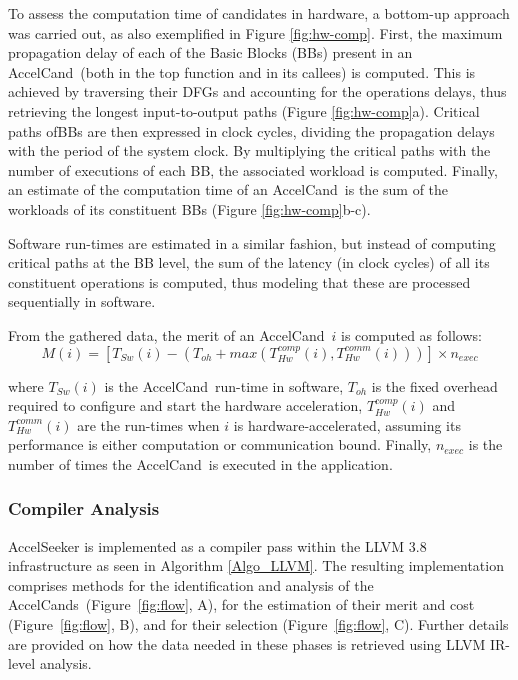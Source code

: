 \documentclass[]{usiinfthesis}
\newcommand{\candidate}{{AccelCand}}
\newcommand{\candidates}{{AccelCand}s}
\begin{document}
To assess the computation time of candidates in hardware, a bottom-up approach was carried out, as also 
exemplified in Figure \ref{fig:hw-comp}. First, the maximum propagation delay of each of the Basic Blocks 
(BBs) present in an \candidate\ (both in the top function and in its callees) is computed.  This is 
achieved by traversing their DFGs and accounting for the operations delays, thus retrieving the longest 
input-to-output paths (Figure \ref{fig:hw-comp}a).  Critical paths ofBBs are then expressed in clock cycles, 
dividing the propagation delays with the period of the system clock. By multiplying the critical paths with 
the number of executions of each BB, the associated workload is computed. Finally, an estimate of the computation time of an \candidate\ is the sum of the workloads of its constituent BBs 
(Figure \ref{fig:hw-comp}b-c).\par

Software run-times are estimated in a similar fashion, but instead of computing critical paths at the BB 
level, the sum of the latency (in clock cycles) of all its constituent operations is computed, thus modeling 
that these are processed sequentially in software.\par

From the gathered data, the merit of an \candidate\ $i$ is computed as
follows:
\begin{equation*}
M(i) = [ T_{Sw}(i) - (T_{oh}+max(T_{Hw}^{comp}(i),T_{Hw}^{comm}(i))) ] \times n_{exec}
\label{eq:inference}
\end{equation*}

where $T_{Sw}(i)$ is the \candidate\ run-time in software, $T_{oh}$ is
the fixed overhead required to configure and start the hardware
acceleration, $T_{Hw}^{comp}(i)$ and $T_{Hw}^{comm}(i)$ are the
run-times when $i$ is hardware-accelerated, assuming its performance
is either computation or communication bound.  Finally, $n_{exec}$ is
the number of times the \candidate\ is executed in the application.

\subsubsection{Compiler Analysis}

AccelSeeker is implemented as a compiler pass within the LLVM
3.8~\cite{LattnerMar04} infrastructure as seen in Algorithm \ref{Algo_LLVM}. 
The resulting implementation
comprises methods for the identification and analysis of the
\candidates\ (Figure~\ref{fig:flow}, A), for the estimation of
their merit and cost (Figure~\ref{fig:flow}, B), and for their
selection (Figure~\ref{fig:flow}, C). Further details are provided 
on how the data needed in these phases is retrieved using LLVM IR-level 
analysis.\par
\end{document}
